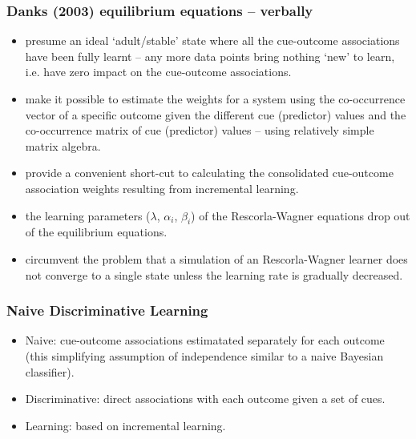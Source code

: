 \begin{frame}
  \frametitle{Danks (2003) equilibrium equations -- verbally} 

  \begin{itemize}

  \item presume an ideal `adult/stable' state where all the
    cue-outcome associations have been fully learnt -- any more data
    points bring nothing `new' to learn, i.e. have zero impact on the
    cue-outcome associations.
    
  \item make it possible to estimate the weights for a system using
    the co-occurrence vector of a specific outcome given the different
    cue (predictor) values and the co-occurrence matrix of cue
    (predictor) values -- using relatively simple matrix algebra.

  \item provide a convenient short-cut to calculating the
    consolidated cue-outcome association weights resulting from
    incremental learning.

  \item the learning parameters ($\lambda$, $\alpha_i$, $\beta_i$) of
    the Rescorla-Wagner equations drop out of the equilibrium
    equations.

  \item circumvent the problem that a simulation of an Rescorla-Wagner
    learner does not converge to a single state unless the learning
    rate is gradually decreased.
    
\end{itemize}

\end{frame}
 
\begin{frame}
  \frametitle{Naive Discriminative Learning}

  \begin{itemize}

  \item Naive: cue-outcome associations estimatated separately for
    each outcome (this simplifying assumption of independence similar to
    a naive Bayesian classifier).

  \item Discriminative: direct associations with each outcome given a set of cues.

  \item Learning: based on incremental learning.

  \end{itemize}

\end{frame}

